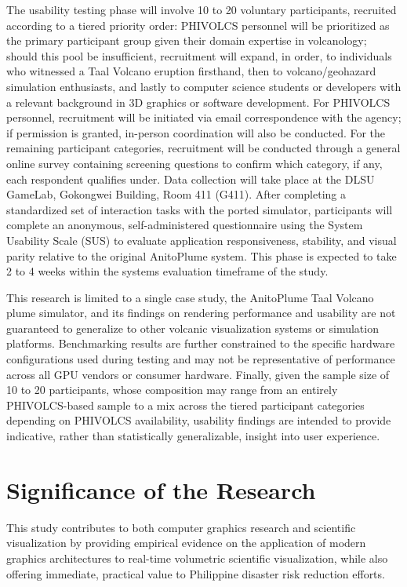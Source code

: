 The usability testing phase will involve 10 to 20 voluntary participants, recruited according to a tiered priority order: PHIVOLCS personnel will be prioritized as the primary participant group given their domain expertise in volcanology; should this pool be insufficient, recruitment will expand, in order, to individuals who witnessed a Taal Volcano eruption firsthand, then to volcano/geohazard simulation enthusiasts, and lastly to computer science students or developers with a relevant background in 3D graphics or software development. For PHIVOLCS personnel, recruitment will be initiated via email correspondence with the agency; if permission is granted, in-person coordination will also be conducted. For the remaining participant categories, recruitment will be conducted through a general online survey containing screening questions to confirm which category, if any, each respondent qualifies under. 
Data collection will take place at the DLSU GameLab, Gokongwei Building, Room 411 (G411). After completing a standardized set of interaction tasks with the ported simulator, participants will complete an anonymous, self-administered questionnaire using the System Usability Scale (SUS) to evaluate application responsiveness, stability, and visual parity relative to the original AnitoPlume system. This phase is expected to take 2 to 4 weeks within the systems evaluation timeframe of the study.

This research is limited to a single case study, the AnitoPlume Taal Volcano plume simulator, and its findings on rendering performance and usability are not guaranteed to generalize to other volcanic visualization systems or simulation platforms. Benchmarking results are further constrained to the specific hardware configurations used during testing and may not be representative of performance across all GPU vendors or consumer hardware. 
Finally, given the sample size of 10 to 20 participants, whose composition may range from an entirely PHIVOLCS-based sample to a mix across the tiered participant categories depending on PHIVOLCS availability, usability findings are intended to provide indicative, rather than statistically generalizable, insight into user experience.

\section{Significance of the Research}
This study contributes to both computer graphics research and scientific visualization by providing empirical evidence on the application of modern graphics architectures to real-time volumetric scientific visualization, while also offering immediate, practical value to Philippine disaster risk reduction efforts.

